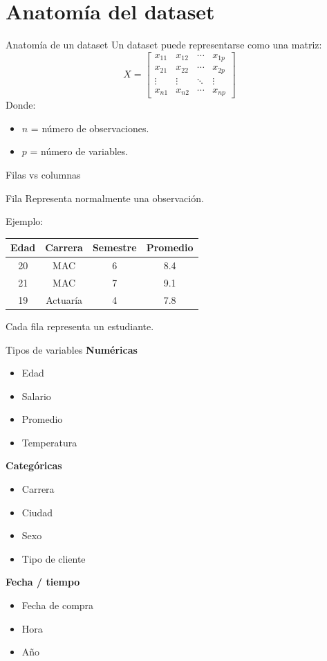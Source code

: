 \documentclass[aspectratio=169,11pt]{beamer}
\begin{document}
\section{Anatomía del dataset}
\begin{frame}{Anatomía de un dataset}
Un dataset puede representarse como una matriz:
\[
X =
\begin{bmatrix}
x_{11} & x_{12} & \cdots & x_{1p}\\
x_{21} & x_{22} & \cdots & x_{2p}\\
\vdots & \vdots & \ddots & \vdots\\
x_{n1} & x_{n2} & \cdots & x_{np}
\end{bmatrix}
\]
Donde:
\begin{itemize}
    \item $n$ = número de observaciones.
    \item $p$ = número de variables.
\end{itemize}
\end{frame}
\begin{frame}{Filas vs columnas}
\begin{block}{Fila}
Representa normalmente una observación.
\end{block}
Ejemplo:
\begin{center}
\begin{tabular}{cccc}
\toprule
Edad & Carrera & Semestre & Promedio\\
\midrule
20 & MAC & 6 & 8.4\\
21 & MAC & 7 & 9.1\\
19 & Actuaría & 4 & 7.8\\
\bottomrule
\end{tabular}
\end{center}
Cada fila representa un estudiante.
\end{frame}
\begin{frame}{Tipos de variables}
\textbf{Numéricas}
\begin{itemize}
    \item Edad
    \item Salario
    \item Promedio
    \item Temperatura
\end{itemize}
\vspace{0.3cm}
\textbf{Categóricas}
\begin{itemize}
    \item Carrera
    \item Ciudad
    \item Sexo
    \item Tipo de cliente
\end{itemize}
\vspace{0.3cm}
\textbf{Fecha / tiempo}
\begin{itemize}
    \item Fecha de compra
    \item Hora
    \item Año
\end{itemize}
\end{frame}
\end{document}
